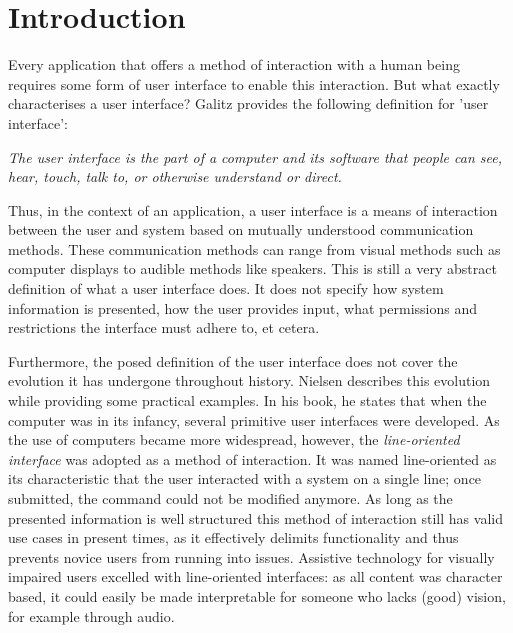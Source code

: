 \chapter{Introduction}
\label{chapter:introduction}
Every application that offers a method of interaction with a human being requires some form of user interface to enable this interaction. But what exactly characterises a user interface? Galitz\cite{galitz2007essential} provides the following definition for 'user interface':
\begin{displayquote}
\textit{The user interface is the part of a computer and its software that people can see, hear, touch, talk to, or otherwise understand or direct.}
\end{displayquote}

Thus, in the context of an application, a user interface is a means of interaction between the user and system based on mutually understood communication methods. These communication methods can range from visual methods such as computer displays to audible methods like speakers. This is still a very abstract definition of what a user interface does. It does not specify how system information is presented, how the user provides input, what permissions and restrictions the interface must adhere to, et cetera. 

Furthermore, the posed definition of the user interface does not cover the evolution it has undergone throughout history. Nielsen\cite{nielsen1994usability} describes this evolution while providing some practical examples. In his book, he states that when the computer was in its infancy, several primitive user interfaces were developed. As the use of computers became more widespread, however, the \textit{line-oriented interface} was adopted as a method of interaction. It was named line-oriented as its characteristic that the user interacted with a system on a single line; once submitted, the command could not be modified anymore. As long as the presented information is well structured this method of interaction still has valid use cases in present times, as it effectively delimits functionality and thus prevents novice users from running into issues. Assistive technology for visually impaired users excelled with line-oriented interfaces: as all content was character based, it could easily be made interpretable for someone who lacks (good) vision, for example through audio\cite{poll1996visualising}.

